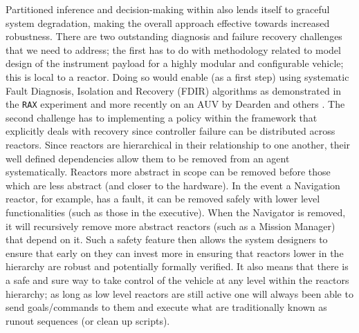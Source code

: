 Partitioned inference and decision-making within \rx also lends itself
to graceful system degradation, making the overall approach effective
towards increased robustness. There are two outstanding diagnosis and
failure recovery challenges that we need to address; the first has to
do with methodology related to model design of the instrument payload
for a highly modular and configurable vehicle; this is local to a
reactor. Doing so would enable (as a first step) using systematic
Fault Diagnosis, Isolation and Recovery (FDIR) algorithms as
demonstrated in the \texttt{RAX} experiment
\cite{williams96,mus98,williams97} and more recently on an AUV by
Dearden and others \cite{wang09,ernits10,dearden11}. The second
challenge has to  implementing a policy within the
\rx framework that explicitly deals with recovery since controller
failure can be distributed across reactors. Since reactors are
hierarchical in their relationship to one another, their well defined
dependencies allow them to be removed from an agent
systematically. Reactors more abstract in scope can be removed before
those which are less abstract (and closer to the hardware). In the
event a Navigation reactor, for example, has a fault, it can be
removed safely with lower level functionalities (such as those in the
executive). When the Navigator is removed, it will recursively remove
more abstract reactors (such as a Mission Manager) that depend on
it. Such a safety feature then allows the system designers to ensure
that early on they can invest more in ensuring that reactors lower in
the hierarchy are robust and potentially formally verified. It also
means that there is a safe and sure way to take control of the vehicle
at any level within the reactors hierarchy; as long as low level
reactors are still active one will always been able to send
goals/commands to them and execute what are traditionally known as
runout sequences (or clean up scripts).

